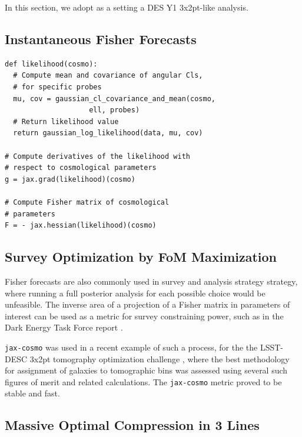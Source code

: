 \documentclass[twocolumn,twocolappendix,nofootinbib]{openjournal}
\begin{document}
In this section, we adopt as a setting a DES Y1 3x2pt-like analysis. 


\subsection{Instantaneous Fisher Forecasts}

\begin{verbatim}
def likelihood(cosmo):
  # Compute mean and covariance of angular Cls, 
  # for specific probes
  mu, cov = gaussian_cl_covariance_and_mean(cosmo, 
                    ell, probes)
  # Return likelihood value
  return gaussian_log_likelihood(data, mu, cov)

# Compute derivatives of the likelihood with 
# respect to cosmological parameters
g = jax.grad(likelihood)(cosmo)

# Compute Fisher matrix of cosmological 
# parameters
F = - jax.hessian(likelihood)(cosmo)
\end{verbatim}



\subsection{Survey Optimization by FoM Maximization}
\label{sec-FOM-optimisation}

Fisher forecasts are also commonly used in survey and analysis strategy strategy, where running a full posterior analysis for each possible choice would be unfeasible. The inverse area of a projection of a Fisher matrix in parameters of interest can be used as a metric for survey constraining power, such as in the Dark Energy Task Force report \citep{detf}.

\texttt{jax-cosmo} was used in a recent example of such a process, for the  the LSST-DESC 3x2pt tomography optimization challenge \citep{2021OJAp....4E..13Z}, where the best methodology for assignment of galaxies to tomographic bins was assessed using several such figures of merit and related calculations. The \texttt{jax-cosmo} metric proved to be stable and fast.



\subsection{Massive Optimal Compression in 3 Lines}
\end{document}
